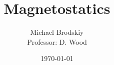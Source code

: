 


\title{Magnetostatics}
\date{\today}
\author{Michael Brodskiy\\ \small Professor: D. Wood}



\maketitle

